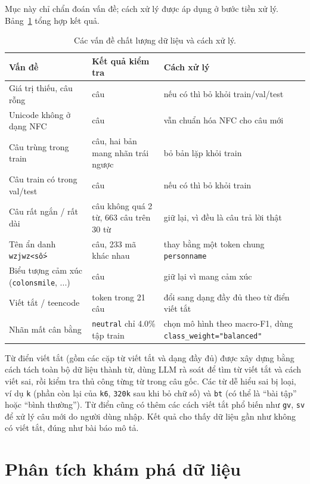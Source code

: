 Mục này chỉ chẩn đoán vấn đề; cách xử lý được áp dụng ở bước tiền xử lý. Bảng~\ref{tab:text-quality} tổng hợp kết quả.

\begin{table}[H]\centering
\caption{Các vấn đề chất lượng dữ liệu và cách xử lý.}\label{tab:text-quality}
\begin{tabular}{>{\raggedright\arraybackslash}p{4.2cm}>{\raggedright\arraybackslash}p{4.6cm}>{\raggedright\arraybackslash}p{5.4cm}}
\toprule
Vấn đề & Kết quả kiểm tra & Cách xử lý \\
\midrule
Giá trị thiếu, câu rỗng & 0 câu & nếu có thì bỏ khỏi train/val/test \\
Unicode không ở dạng NFC & 0 câu & vẫn chuẩn hóa NFC cho câu mới \\
Câu trùng trong train & 1 câu, hai bản mang nhãn trái ngược & bỏ bản lặp khỏi train \\
Câu train có trong val/test & 0 câu & nếu có thì bỏ khỏi train \\
Câu rất ngắn / rất dài & 141 câu không quá 2 từ, 663 câu trên 30 từ & giữ lại, vì đều là câu trả lời thật \\
Tên ẩn danh \texttt{wzjwz<số>} & 211 câu, 233 mã khác nhau & thay bằng một token chung \texttt{personname} \\
Biểu tượng cảm xúc (\texttt{colonsmile}, ...) & 85 câu & giữ lại vì mang cảm xúc \\
Viết tắt / teencode & 25 token trong 21 câu & đổi sang dạng đầy đủ theo từ điển viết tắt \\
Nhãn mất cân bằng & \texttt{neutral} chỉ 4.0\% tập train & chọn mô hình theo macro-F1, dùng \texttt{class\_weight="balanced"} \\
\bottomrule
\end{tabular}
\end{table}

Từ điển viết tắt (gồm các cặp từ viết tắt và dạng đầy đủ) được xây dựng bằng cách tách
toàn bộ dữ liệu thành từ, dùng LLM rà soát để tìm từ viết tắt và cách viết sai, rồi kiểm tra thủ công từng từ trong câu
gốc. Các từ dễ hiểu sai bị loại, ví dụ \texttt{k} (phần còn lại của \texttt{k6}, \texttt{320k} sau khi bỏ chữ số) và
\texttt{bt} (có thể là ``bài tập'' hoặc ``bình thường''). Từ điển cũng có thêm các cách viết tắt phổ biến như
\texttt{gv}, \texttt{sv} để xử lý câu mới do người dùng nhập. Kết quả cho thấy dữ liệu gần như không có viết tắt, đúng
như bài báo mô tả.

\section{Phân tích khám phá dữ liệu}

